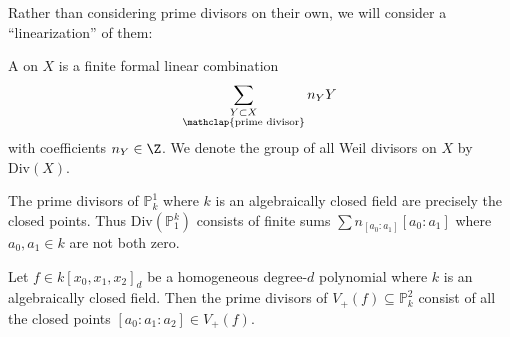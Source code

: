 \documentclass[wip, algebra]{bsteffan-lecturenotes}
\renewcommand{\P}{\mathbb{P}}
\newcommand{\Div}{\mathrm{Div}}
\begin{document}
Rather than considering prime divisors on their own, we will consider a \enquote{linearization} of them:
\begin{definition}
	A  on $X$ is a finite formal linear combination 
	\begin{equation*}
		\sum_{\substack{Y \subset X \\ \mathclap{\text{prime divisor}}}} n_Y Y
	\end{equation*}
	with coefficients $n_Y \in \Z$.
	We denote the group of all Weil divisors on $X$ by $\Div(X)$.
\end{definition}
\begin{example}
	The prime divisors of $\P^1_k$ where $k$ is an algebraically closed field are precisely the closed points. 
	Thus $\Div(\P^k_1)$ consists of finite sums $\sum n_{[a_0 : a_1]} [a_0 : a_1]$ where $a_0, a_1 \in k$ are not both zero.
\end{example}
\begin{example}
	Let $f \in k[x_0, x_1, x_2]_d$ be a homogeneous degree-$d$ polynomial where $k$ is an algebraically closed field.
	Then the prime divisors of $V_+(f) \subseteq \P^2_k$ consist of all the closed points $[a_0 : a_1 : a_2] \in V_+(f)$.
\end{example}

\printindex
\printbibliography
\end{document}

